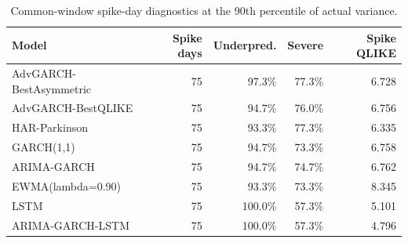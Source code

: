 \begin{table}[!t]
\centering
\caption{Common-window spike-day diagnostics at the 90th percentile of actual variance.}
\label{tab:common-window-spike-diagnostics}
\scriptsize
\begin{tabular}{@{}L{0.24\textwidth}rrrr@{}}
\toprule
Model & Spike days & Underpred. & Severe & Spike QLIKE \\
\midrule
AdvGARCH-BestAsymmetric & 75 & 97.3\% & 77.3\% & 6.728 \\
AdvGARCH-BestQLIKE & 75 & 94.7\% & 76.0\% & 6.756 \\
HAR-Parkinson & 75 & 93.3\% & 77.3\% & 6.335 \\
GARCH(1,1) & 75 & 94.7\% & 73.3\% & 6.758 \\
ARIMA-GARCH & 75 & 94.7\% & 74.7\% & 6.762 \\
EWMA(lambda=0.90) & 75 & 93.3\% & 73.3\% & 8.345 \\
LSTM & 75 & 100.0\% & 57.3\% & 5.101 \\
ARIMA-GARCH-LSTM & 75 & 100.0\% & 57.3\% & 4.796 \\
\bottomrule
\end{tabular}
\end{table}
